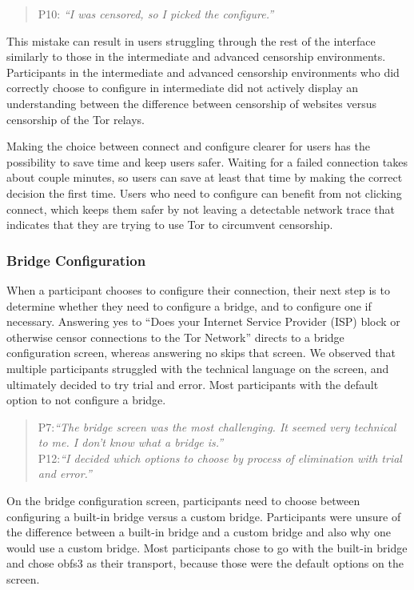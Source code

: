 \documentclass[USenglish,oneside,twocolumn]{article}
\begin{document}
\begin{quotation}
\noindent P10: \textit{``I was censored, so I picked the configure.''}
\end{quotation}

This mistake can result in users struggling through the rest of the interface similarly to those in the intermediate and advanced censorship environments.
Participants in the intermediate and advanced censorship environments who did correctly choose to configure in intermediate did not actively display an understanding between the difference between censorship of websites versus censorship of the Tor relays.

Making the choice between connect and configure clearer for users has the possibility to save time and keep users safer. Waiting for a failed connection takes about couple minutes, so users can save at least that time by making the correct decision the first time. Users who need to configure can benefit from not clicking connect, which keeps them safer by not leaving a detectable network trace that indicates that they are trying to use Tor to circumvent censorship.\\

\subsubsection{Bridge Configuration} 
When a participant chooses to configure their connection, their next step is to determine whether they need to configure a bridge, and to configure one if necessary. Answering yes to ``Does your Internet Service Provider (ISP) block or otherwise censor connections to the Tor Network'' directs to a bridge configuration screen, whereas answering no skips that screen. We observed that multiple participants struggled with the technical language on the screen, and ultimately decided to try trial and error. Most participants with the default option to not configure a bridge. 

\begin{quotation}
\noindent P7:\textit{``The bridge screen was the most challenging. It seemed very technical to me. I don't know what a bridge is.''}\\

\noindent P12:\textit{``I decided which options to choose by process of elimination with trial and error.''}
\end{quotation} 

On the bridge configuration screen, participants need to choose between configuring a built-in bridge versus a custom bridge. Participants were unsure of the difference between a built-in bridge and a custom bridge and also why one would use a custom bridge. Most participants chose to go with the built-in bridge and chose obfs3 as their transport, because those were the default options on the screen. 
\end{document}
